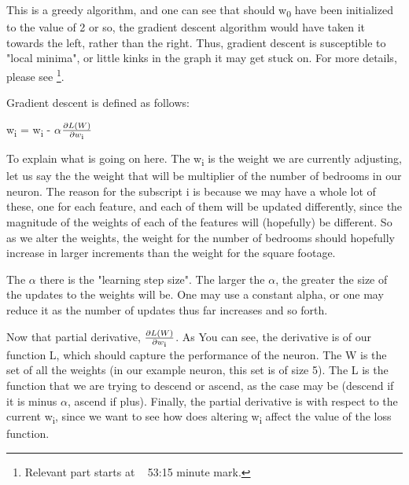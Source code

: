 \documentclass[a4paper, 12pt]{article}
\begin{document}
                        \par This is a greedy algorithm, and one can see that should w\textsubscript{0} have been initialized to the value of 2 or so, the gradient descent algorithm would have taken it towards the left, rather than the right. Thus, gradient descent is susceptible to "local minima", or little kinks in the graph it may get stuck on. For more details, please see \cite{logisticRegression}\footnote{Relevant part starts at ~ 53:15 minute mark.}.
                        
                        \par Gradient descent is defined as follows:
                        
                        \par {\LARGE w\textsubscript{i} = w\textsubscript{i} - 
                        \(\alpha\)\(\frac{\partial L(W)}{\partial w\textsubscript{i}}\)}
                        
                        \bigskip
                        
                        \par To explain what is going on here. The w\textsubscript{i} is the weight we are currently adjusting, let us say the the weight that will be multiplier of the number of bedrooms in our neuron. The reason for the subscript i is because we may have a whole lot of these, one for each feature, and each of them will be updated differently, since the magnitude of the weights of each of the features will (hopefully) be different. So as we alter the weights, the weight for the number of bedrooms should hopefully increase in larger increments than the weight for the square footage.
                        
                        \par The \(\alpha\) there is the "learning step size". The larger the \(\alpha\), the greater the size of the updates to the weights will be. One may use a constant alpha, or one may reduce it as the number of updates thus far increases and so forth.
                        
                        \par Now that partial derivative, {\Large \(\frac{\partial L(W)}{\partial w\textsubscript{i}}\)}. As You can see, the derivative is of our function L, which should capture the performance of the neuron. The W is the set of all the weights (in our example neuron, this set is of size 5). The L is the function that we are trying to descend or ascend, as the case may be (descend if it is minus \(\alpha\), ascend if plus). Finally, the partial derivative is with respect to the current w\textsubscript{i}, since we want to see how does altering w\textsubscript{i} affect the value of the loss function.
                        
\end{document}
